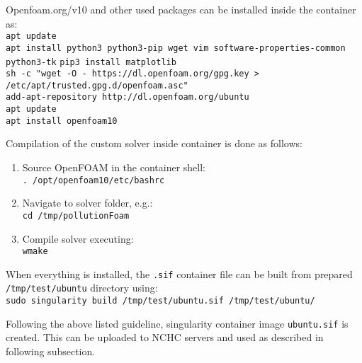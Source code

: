 Openfoam.org/v10 and other used packages can be installed inside the container as:\\[0.2cm]
    \indent\quad\quad\texttt{apt update}\\[0.2cm]
    \indent\quad\quad\texttt{apt install python3 python3-pip wget vim software-properties-common \\ \indent\quad\quad\quad\quad python3-tk}
    \indent\quad\quad\texttt{pip3 install matplotlib}\\[0.2cm]
    \indent\quad\quad\texttt{sh -c "wget -O - https://dl.openfoam.org/gpg.key >} \\ \indent\quad\quad\quad\quad\texttt{/etc/apt/trusted.gpg.d/openfoam.asc"}\\[0.2cm]
    \indent\quad\quad\texttt{add-apt-repository http://dl.openfoam.org/ubuntu}\\[0.2cm]
    \indent\quad\quad\texttt{apt update}\\[0.2cm]
    \indent\quad\quad\texttt{apt install openfoam10}

Compilation of the custom solver inside container is done as follows:
\begin{enumerate}
    \item Source OpenFOAM in the container shell:\\[0.2cm] 
    \indent\quad\quad\texttt{. /opt/openfoam10/etc/bashrc}
    \item Navigate to solver folder, e.g.:\\[0.2cm] 
    \indent\quad\quad\texttt{cd /tmp/pollutionFoam} 
    \item Compile solver executing: \\[0.2cm] 
    \indent\quad\quad\texttt{wmake}
\end{enumerate}

When everything is installed, the \texttt{.sif} container file can be built from prepared \texttt{/tmp/test/ubuntu} directory using:\\[0.2cm] 
\indent\quad\quad\texttt{sudo singularity build /tmp/test/ubuntu.sif /tmp/test/ubuntu/}

Following the above listed guideline, singularity container image \texttt{ubuntu.sif} is created. This can be uploaded to NCHC servers and used as described in following subsection. 

